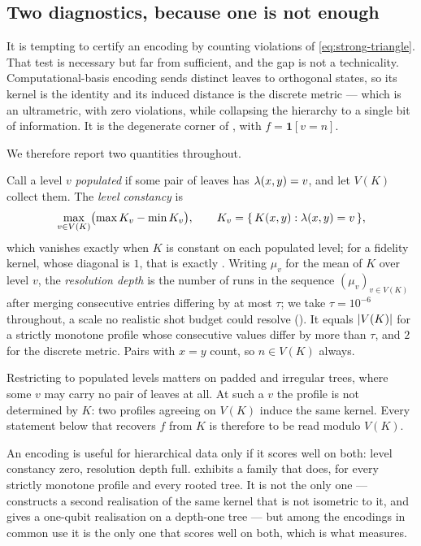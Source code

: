 \subsection{Two diagnostics, because one is not enough}
\label{subsec:diagnostics}

It is tempting to certify an encoding by counting violations of
\cref{eq:strong-triangle}. That test is necessary but far from sufficient, and the gap
is not a technicality. Computational-basis encoding sends distinct leaves to orthogonal
states, so its kernel is the identity and its induced distance is the discrete metric
--- which is an ultrametric, with zero violations, while collapsing the hierarchy to a
single bit of information. It is the degenerate corner of
, with $f = \mathbf{1}[v = n]$.

We therefore report two quantities throughout.

\begin{definition}
  \label{def:diagnostics}
  Call a level $v$ \emph{populated} if some pair of leaves has $\lambda(x,y) = v$,
  and let $V(K)$ collect them. The \emph{level constancy} is
  \begin{equation*}
    \max_{v \in V(K)} \bigl( \max K_v - \min K_v \bigr),
    \qquad K_v = \{\, K(x,y) : \lambda(x,y) = v \,\},
  \end{equation*}
  which vanishes exactly when $K$ is constant on each populated level; for a fidelity
  kernel, whose diagonal is $1$, that is exactly . Writing
  $\mu_v$ for the mean of $K$ over level $v$, the \emph{resolution depth} is the
  number of runs in the sequence $(\mu_v)_{v \in V(K)}$ after merging consecutive
  entries differing by at most $\tau$; we take $\tau = 10^{-6}$ throughout, a scale no
  realistic shot budget could resolve (). It equals $\lvert V(K)\rvert$ for a
  strictly monotone profile whose consecutive values differ by more than $\tau$, and
  $2$ for the discrete metric. Pairs with $x = y$ count, so $n \in V(K)$ always.

  Restricting to populated levels matters on padded and irregular trees, where some $v$
  may carry no pair of leaves at all. At such a $v$ the profile is not determined by
  $K$: two profiles agreeing on $V(K)$ induce the same kernel. Every statement below
  that recovers $f$ from $K$ is therefore to be read modulo $V(K)$.
\end{definition}

An encoding is useful for hierarchical data only if it scores well on both: level
constancy zero, resolution depth full.  exhibits a family that
does, for every strictly monotone profile and every rooted tree. It is not the only
one ---  constructs a second realisation of the same kernel that
is not isometric to it, and  gives a one-qubit realisation on a
depth-one tree --- but among the encodings in common use it is the only one that scores
well on both, which is what  measures.

